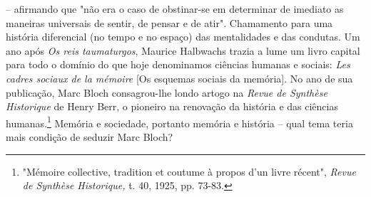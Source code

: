 \documentclass[a5paper]{book}
\begin{document}
-- af{\kern0pt}irmando que "não era o caso de obstinar-se em determinar de imediato as maneiras universais de sentir, de pensar e de atir". Chamamento para uma história diferencial (no tempo e no espaço) das mentalidades e das condutas. Um ano após \textit{Os reis taumaturgos}, Maurice Halbwachs trazia a lume um livro capital para todo o domínio do que hoje denominamos ciências humanas e sociais: \textit{Les cadres sociaux de la mémoire} [Os esquemas sociais da memória]. No ano de sua publicação, Marc Bloch consagrou-lhe londo artogo na \textit{Revue de Synthèse Historique} de Henry Berr, o pioneiro na renovação da história e das ciências humanas.\footnote{"Mémoire collective, tradition et coutume à propos d'un livre récent", \textit{Revue de Synthèse Historique,} t. 40, 1925, pp. 73-83.} Memória e sociedade, portanto memória e história -- qual tema teria mais condição de seduzir Marc Bloch?
\end{document}
